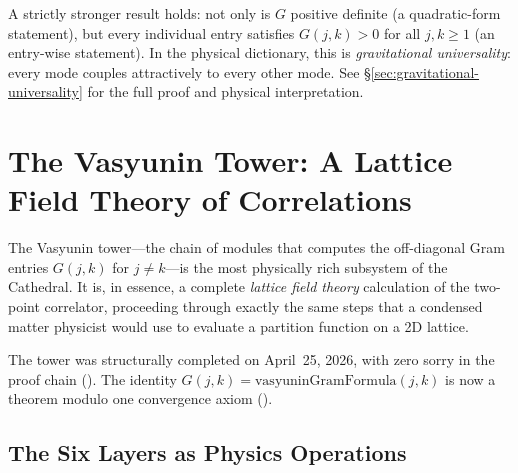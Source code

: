 \documentclass[11pt,a4paper]{article}
\begin{document}
\begin{observation}
A strictly stronger result holds: not only is $G$ positive definite
(a quadratic-form statement), but every individual entry satisfies
$G(j,k) > 0$ for all $j,k \geq 1$ (an entry-wise statement).
In the physical dictionary, this is \emph{gravitational universality}:
every mode couples attractively to every other mode. See
\S\ref{sec:gravitational-universality} for the full proof and
physical interpretation.
\end{observation}

\section{The Vasyunin Tower: A Lattice Field Theory of Correlations}
\label{sec:vasyunin}

The Vasyunin tower---the chain of modules that computes the off-diagonal
Gram entries $G(j,k)$ for $j \neq k$---is the most physically rich
subsystem of the Cathedral. It is, in essence, a complete
\emph{lattice field theory} calculation of the two-point correlator,
proceeding through exactly the same steps that a condensed matter
physicist would use to evaluate a partition function on a 2D lattice.

The tower was structurally completed on April~25, 2026, with zero sorry
in the proof chain (). The identity
$G(j,k) = \text{vasyuninGramFormula}(j,k)$ is now a theorem modulo
one convergence axiom ().

\subsection{The Six Layers as Physics Operations}
\end{document}
